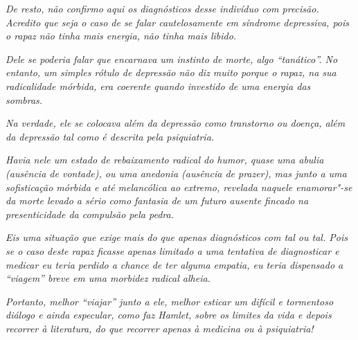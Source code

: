 \emph{De resto, não confirmo aqui os diagnósticos desse indivíduo com
precisão. Acredito que seja o caso de se falar cautelosamente em
síndrome depressiva, pois o rapaz não tinha mais energia, não tinha mais
libido.}~

\emph{Dele se poderia falar que encarnava um instinto de morte, algo
``tanático''. No entanto, um simples rótulo de depressão não diz muito
porque o rapaz, na sua radicalidade mórbida, era coerente quando
investido de uma energia das sombras.}~

\emph{Na verdade, ele se colocava além da depressão como transtorno ou
doença, além da depressão tal como é descrita pela psiquiatria.}~

\emph{Havia nele um estado de rebaixamento radical do humor, quase uma
abulia (ausência de vontade), ou uma anedonia (ausência de prazer), mas
junto a uma sofisticação mórbida e até melancólica ao extremo, revelada
naquele enamorar"-se da morte levado a sério como fantasia de um futuro
ausente fincado na presenticidade da compulsão pela pedra.}~

\emph{Eis uma situação que exige mais do que apenas diagnósticos com 
tal ou  tal. Pois se o caso deste rapaz ficasse apenas limitado a uma
tentativa de diagnosticar e medicar eu teria perdido a chance de ter
alguma empatia, eu teria dispensado a ``viagem'' breve em uma morbidez
radical alheia.}~

\emph{Portanto, melhor ``viajar'' junto a ele, melhor esticar um difícil
e tormentoso diálogo e ainda especular, como faz Hamlet, sobre os
limites da vida e depois recorrer à literatura, do que recorrer apenas à
medicina ou à psiquiatria!~}~
